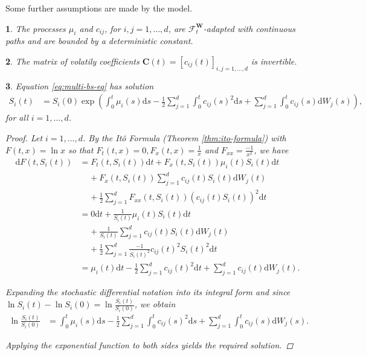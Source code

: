 \documentclass[english]{article}
\numberwithin{equation}{section}
\numberwithin{figure}{section}
\theoremstyle{bolddescit}
\newtheorem{theorem}{\protect\theoremname}[section]
\theoremstyle{definition}
\theoremstyle{definition}
\theoremstyle{plain}
\theoremstyle{plain}
\theoremstyle{bolddesc}
\newtheorem{assumption}[theorem]{\protect\assumptionname}
\theoremstyle{plain}
\theoremstyle{remark}
\providecommand{\assumptionname}{Assumption}
\providecommand{\theoremname}{Theorem}
\begin{document}
Some further assumptions are made by the model.

\begin{assumption}\label{ass:drift-vol-regularity}
  The processes $\mu_i$ and $c_{ij}$, for $i,j=1,\ldots,d$, are $\mathcal{F}^\mathbf{W}_t$-adapted with continuous paths and are bounded by a deterministic constant.
\end{assumption}

\begin{assumption}\label{ass:vol-matrix-invertible}
  The matrix of volatily coefficients $\mathbf{C}(t)= [c_{ij}(t)]_{i,j=1,\ldots,d}$ is invertible.
\end{assumption}

\begin{theorem}\label{thm:bs-solution}
  Equation \eqref{eq:multi-bs-eq} has solution
  \begin{align*}
    S_i(t) &= S_i(0) \exp \left( \int_0^t \mu_i(s) \mathrm{d}s - \frac{1}{2} \sum_{j=1}^{d} \int_0^t c_{ij}(s)^2 \mathrm{d}s + \sum_{j=1}^d \int_0^t c_{ij}(s) \mathrm{d}W_j(s) \right),
  \end{align*}
  for all $i=1,\ldots,d$.

  \begin{proof}
    Let $i = 1,\ldots,d$. By the It\^o Formula (Theorem \ref{thm:ito-formula}) with $F(t,x) = \ln x$ so that $F_t(t,x) = 0, F_x(t,x) = \frac{1}{x}$ and $F_{xx} = \frac{-1}{x^2}$, we have
    \begin{align*}
      \mathrm{d}F(t,S_i(t))
      &= F_t(t,S_i(t)) \mathrm{d}t + F_x(t,S_i(t)) \mu_i(t) S_i(t) \mathrm{d}t\\
      &\ \ \ \ \ + F_x(t,S_i(t)) \sum_{j=1}^d c_{ij}(t) S_i(t) \mathrm{d}W_j(t)\\
      &\ \ \ \ \ + \frac{1}{2} \sum_{j=1}^d F_{xx}(t,S_i(t)) (c_{ij}(t) S_i(t))^2 \mathrm{d}t\\
      &= 0 \mathrm{d}t + \frac{1}{S_i(t)} \mu_i(t) S_i(t) \mathrm{d}t\\
      &\ \ \ \ \ + \frac{1}{S_i(t)} \sum_{j=1}^d c_{ij}(t) S_i(t) \mathrm{d}W_j(t)\\
      &\ \ \ \ \ + \frac{1}{2} \sum_{j=1}^d \frac{-1}{S_i(t)^2} c_{ij}(t)^2 S_i(t)^2 \mathrm{d}t\\
      &= \mu_i(t) \mathrm{d}t
      - \frac{1}{2} \sum_{j=1}^d c_{ij}(t)^2 \mathrm{d}t
      + \sum_{j=1}^d c_{ij}(t) \mathrm{d}W_j(t).
    \end{align*}

    Expanding the stochastic differential notation into its integral form and since $\ln S_i(t) - \ln S_i(0) = \ln \frac{S_i(t)}{S_i(0)}$, we obtain
    \begin{align*}
      \ln \frac{S_i(t)}{S_i(0)}
      &= \int_0^t \mu_i(s) \mathrm{d}s
      - \frac{1}{2} \sum_{j=1}^d \int_0^t c_{ij}(s)^2 \mathrm{d}s
      + \sum_{j=1}^d \int_0^t c_{ij}(s) \mathrm{d}W_j(s).
    \end{align*}

    Applying the exponential function to both sides yields the required solution.
  \end{proof}
\end{theorem}
\end{document}
